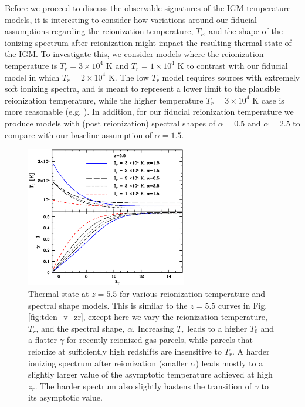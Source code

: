 Before we proceed to discuss the observable signatures of the IGM temperature models, it is interesting to consider
how variations around our fiducial assumptions regarding the reionization temperature, $T_r$, and the shape
of the ionizing spectrum after reionization might impact the resulting thermal state of the IGM. To investigate this,
we consider models where the reionization temperature is $T_r = 3 \times 10^4$ K and $T_r=1 \times 10^4$ K to
contrast with our fiducial model in which $T_r = 2 \times 10^4$ K. The low $T_r$ model requires sources with
extremely soft ionizing spectra, and is meant to represent a lower limit to the plausible reionization temperature,
while the higher temperature $T_r = 3 \times 10^4$ K case is more reasonable (e.g. \citealt{McQuinn:2012bq}).  
In addition, for our fiducial reionization temperature
we produce models with (post reionization) spectral shapes of $\alpha=0.5$ and $\alpha=2.5$ to compare with our baseline assumption of
$\alpha=1.5$.

\begin{figure}[t]
\includegraphics[width=7cm]{f8.eps}
\caption{Thermal state at $z=5.5$ for various reionization temperature and spectral shape models. This is similar to the
$z=5.5$ curves in Fig. \ref{fig:tden_v_zr}, except here we vary the reionization temperature, $T_r$, and the spectral shape,
$\alpha$. Increasing $T_r$ leads to a higher $T_0$ and a flatter $\gamma$ for recently reionized gas parcels, while parcels
that reionize at sufficiently high redshifts are insensitive to $T_r$. A harder ionizing spectrum after reionization 
(smaller $\alpha$) leads mostly to a slightly larger value of the asymptotic temperature achieved at high $z_r$.
The harder spectrum also slightly hastens the transition of $\gamma$ to its asymptotic value.}
\label{fig:temp_v_treion}
\end{figure}

